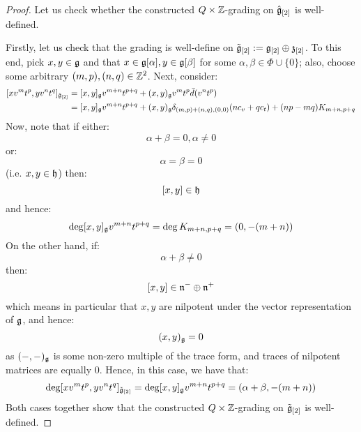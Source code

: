             \begin{proof}
                Let us check whether the constructed $Q \x \Z$-grading on $\hat{\mathfrak{g}}_{[2]}$ is well-defined.

                Firstly, let us check that the grading is well-define on $\tilde{\mathfrak{g}}_{[2]} := \mathfrak{g}_{[2]} \oplus \mathfrak{z}_{[2]}$. To this end, pick $x, y \in \mathfrak{g}$ and that $x \in \mathfrak{g}[\alpha], y \in \mathfrak{g}[\beta]$ for some $\alpha, \beta \in \Phi \cup \{0\}$; also, choose some arbitrary $(m, p), (n, q) \in \mathbb{Z}^2$. Next, consider:
                    $$
                        \begin{aligned}
                            [x v^m t^p, y v^n t^q]_{\tilde{\g}_{[2]}} & = [x, y]_{\g} v^{m + n} t^{p + q} + (x, y)_{\g} v^m t^p \bar{d}(v^n t^p)
                            \\
                            & = [x, y]_{\g} v^{m + n} t^{p + q} + (x, y)_{\g} \delta_{(m, p) + (n, q), (0, 0)} ( n c_v + q c_t ) + (np - mq) K_{m + n, p + q}
                        \end{aligned}
                    $$
                Now, note that if either:
                    $$\alpha + \beta = 0, \alpha \not = 0$$
                or:
                    $$\alpha = \beta = 0$$
                (i.e. $x, y \in \mathfrak{h}$) then:
                    $$[x, y] \in \mathfrak{h}$$
                and hence:
                    $$\deg [x, y]_{\mathfrak{g}} v^{m + n} t^{p + q} = \deg K_{m + n, p + q} = (0, -(m + n))$$
                On the other hand, if:
                    $$\alpha + \beta \not = 0$$
                then:
                    $$[x, y] \in \mathfrak{n}^- \oplus \mathfrak{n}^+$$
                which means in particular that $x, y$ are nilpotent under the vector representation of $\mathfrak{g}$, and hence:
                    $$(x, y)_{\mathfrak{g}} = 0$$
                as $(-, -)_{\mathfrak{g}}$ is some non-zero multiple of the trace form, and traces of nilpotent matrices are equally $0$. Hence, in this case, we have that:
                    $$\deg [x v^m t^p, y v^n t^q]_{\tilde{\mathfrak{g}}_{[2]}} = \deg [x, y]_{\mathfrak{g}} v^{m + n} t^{p + q} = (\alpha + \beta, -(m + n))$$
                Both cases together show that the constructed $Q \x \Z$-grading on $\tilde{\mathfrak{g}}_{[2]}$ is well-defined. 
                

\end{proof}
